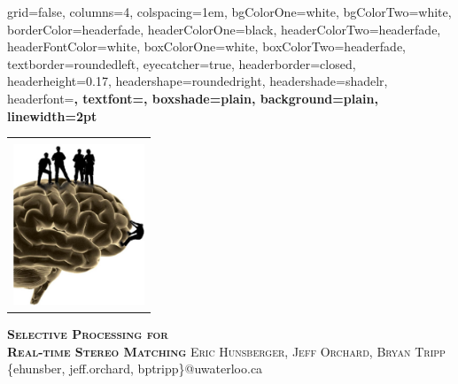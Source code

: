 \documentclass[landscape,final,a0paper,fontscale=0.32]{baposter}
\begin{document}



\begin{poster}%
  {
  grid=false,
  columns=4,
  colspacing=1em,
  bgColorOne=white,
  bgColorTwo=white,
  borderColor=headerfade,
  headerColorOne=black,
  headerColorTwo=headerfade,
  headerFontColor=white,
  boxColorOne=white,
  boxColorTwo=headerfade,
  textborder=roundedleft,
  eyecatcher=true,
  headerborder=closed,
  headerheight=0.17\textheight,
  headershape=roundedright,
  headershade=shadelr,
  headerfont=\Large\bf\textsc, %
  textfont={\setlength{\parindent}{1.5em}},
  boxshade=plain,
  background=plain,
  linewidth=2pt
  }
  {
    \begin{tabular}{c}
      \relax\\
      \includegraphics[height=13em]{brain.png}
    \end{tabular}
  }
  {
    \textbf{\textsc{Selective Processing for\\[0.2em] Real-time Stereo Matching}}\vspace{0.5em}
  }
  {
    \textsc{Eric Hunsberger, Jeff Orchard, Bryan Tripp}\\[0.2em]
    \{ehunsber, jeff.orchard, bptripp\}@uwaterloo.ca\\[0.4em]
}
\end{poster}
\end{document}
